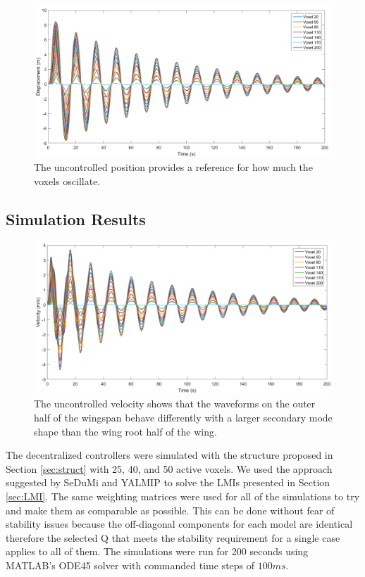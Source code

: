 \documentclass[11pt]{ucthesis}
\begin{document}
\begin{figure}[thpb]
\centering
\includegraphics[width=0.75\linewidth]{Figures/LMIUncontrolDisplacement.png}
\caption{The uncontrolled position provides a reference for how much the voxels oscillate.}
\label{fig:UCPos}
\end{figure}

\subsection{Simulation Results}
\label{sec:results}
\begin{figure}[thpb]
\centering
\includegraphics[width=0.75\linewidth]{Figures/LMIUncontrolVelocity.png}
\caption{The uncontrolled velocity shows that the waveforms on the outer half of the wingspan behave differently with a larger secondary mode shape than the wing root half of the wing.}
\label{fig:UCVel}
\end{figure}
The decentralized controllers were simulated with the structure proposed in Section \ref{sec:struct} with 25, 40, and 50 active voxels. We used the approach suggested by SeDuMi and YALMIP \cite{lofberg2004yalmip} to solve the LMIs presented in Section \ref{sec:LMI}. The same weighting matrices were used for all of the simulations to try and make them as comparable as possible. This can be done without fear of stability issues because the off-diagonal components for each model are identical therefore the selected Q that meets the stability requirement for a single case applies to all of them. The simulations were run for 200 seconds using MATLAB's ODE45 solver with commanded time steps of $100ms$.
\end{document}
